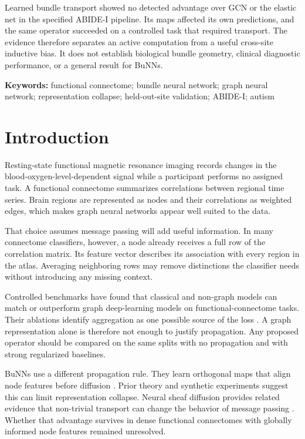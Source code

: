 \documentclass[11pt,a4paper]{article}
\begin{document}
Learned bundle transport showed no detected advantage over GCN or the elastic
net in the specified ABIDE-I pipeline. Its maps affected its own predictions,
and the same operator succeeded on a controlled task that required transport.
The evidence therefore separates an active computation from a useful
cross-site inductive bias. It does not establish biological bundle geometry,
clinical diagnostic performance, or a general result for BuNNs.

\noindent\textbf{Keywords:} functional connectome; bundle neural network;
graph neural network; representation collapse; held-out-site validation;
ABIDE-I; autism

\clearpage
\tableofcontents
\clearpage

\setcounter{page}{1}

\section{Introduction}

Resting-state functional magnetic resonance imaging records changes in the
blood-oxygen-level-dependent signal while a participant performs no assigned
task. A functional connectome summarizes correlations between regional time
series. Brain regions are represented as nodes and their correlations as
weighted edges, which makes graph neural networks appear well suited to the
data.

That choice assumes message passing will add useful information. In many
connectome classifiers, however, a node already receives a full row of the
correlation matrix. Its feature vector describes its association with every
region in the atlas. Averaging neighboring rows may remove distinctions the
classifier needs without introducing any missing context.

Controlled benchmarks have found that classical and non-graph models can
match or outperform graph deep-learning models on functional-connectome
tasks. Their ablations identify aggregation as one possible source of the loss
\cite{han2026rethinking}. A graph representation alone is therefore not enough
to justify propagation. Any proposed operator should be compared on the same
splits with no propagation and with strong regularized baselines.

BuNNs use a different propagation rule. They learn orthogonal maps that align
node features before diffusion \cite{bamberger2025bundle}. Prior theory and
synthetic experiments suggest this can limit representation collapse. Neural
sheaf diffusion provides related evidence that non-trivial transport can
change the behavior of message passing \cite{bodnar2022sheaf}. Whether that
advantage survives in dense functional connectomes with globally informed
node features remained unresolved.
\end{document}
